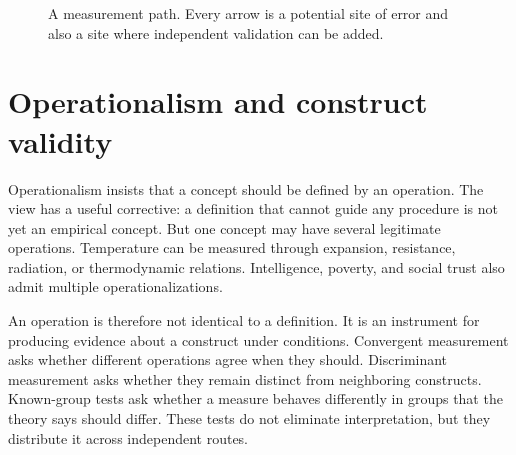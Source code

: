 \begin{figure}[ht]
\centering
{}
\caption{A measurement path. Every arrow is a potential site of error and
also a site where independent validation can be added.}
\label{fig:measurement-path}
\end{figure}

\section{Operationalism and construct validity}

Operationalism insists that a concept should be defined by an operation. The
view has a useful corrective: a definition that cannot guide any procedure is
not yet an empirical concept. But one concept may have several legitimate
operations. Temperature can be measured through expansion, resistance,
radiation, or thermodynamic relations. Intelligence, poverty, and social trust
also admit multiple operationalizations.

An operation is therefore not identical to a definition. It is an instrument
for producing evidence about a construct under conditions. Convergent
measurement asks whether different operations agree when they should.
Discriminant measurement asks whether they remain distinct from neighboring
constructs. Known-group tests ask whether a measure behaves differently in
groups that the theory says should differ. These tests do not eliminate
interpretation, but they distribute it across independent routes.

